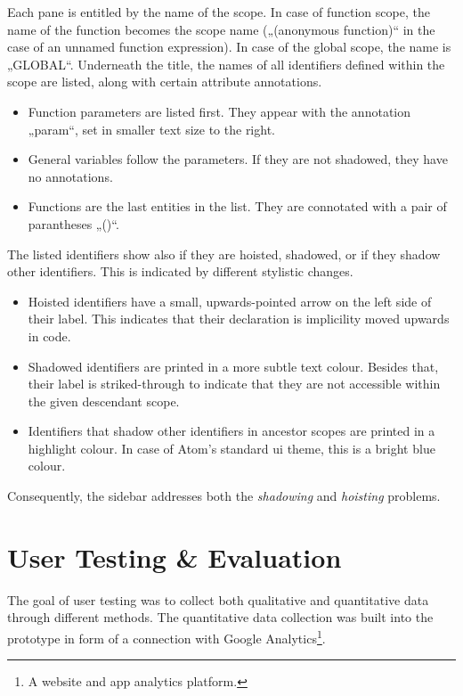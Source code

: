 Each pane is entitled by the name of the scope. In case of function
scope, the name of the function becomes the scope name („(anonymous
function)“ in the case of an unnamed function expression). In case of
the global scope, the name is „GLOBAL“. Underneath the title, the names
of all identifiers defined within the scope are listed, along with
certain attribute annotations.

\begin{itemize}
\itemsep1pt\parskip0pt
\item
  Function parameters are listed first. They appear with the annotation
  „param“, set in smaller text size to the right.
\item
  General variables follow the parameters. If they are not shadowed,
  they have no annotations.
\item
  Functions are the last entities in the list. They are connotated with
  a pair of parantheses „()“.
\end{itemize}

The listed identifiers show also if they are hoisted, shadowed, or if
they shadow other identifiers. This is indicated by different stylistic
changes.

\begin{itemize}
\itemsep1pt\parskip0pt
\item
  Hoisted identifiers have a small, upwards-pointed arrow on the left
  side of their label. This indicates that their declaration is
  implicility moved upwards in code.
\item
  Shadowed identifiers are printed in a more subtle text colour. Besides
  that, their label is striked-through to indicate that they are not
  accessible within the given descendant scope.
\item
  Identifiers that shadow other identifiers in ancestor scopes are
  printed in a highlight colour. In case of Atom’s standard \ac{ui}
  theme, this is a bright blue colour.
\end{itemize}

Consequently, the sidebar addresses both the \emph{shadowing} and
\emph{hoisting} problems.

\section{User Testing \& Evaluation}\label{user-testing-evaluation}

The goal of user testing was to collect both qualitative and
quantitative data through different methods. The quantitative data
collection was built into the prototype in form of a connection with
Google Analytics\footnote{A website and app analytics platform.}.

